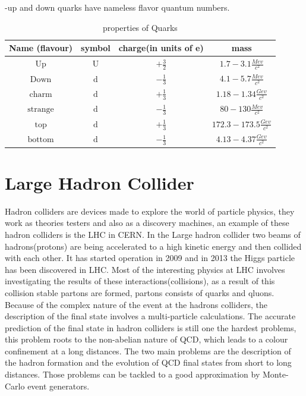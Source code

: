 -up and down quarks have nameless flavor quantum numbers.\citep{particle}

\begin{table}
\begin{center} 
 \begin{tabular}{|c|c|c|c|} \hline 
  Name (flavour) & symbol & charge(in units of e) & mass  \\ \hline 
  $\text{Up}$ & $\text{U}$ &$ +\frac{3}{2}$ & $1.7-3.1 \frac{Mev}{c^2}$\\\hline
  $\text{Down}$&$\text{d}$&$-\frac{1}{3}$& $4.1-5.7\frac{Mev}{c^2}$\\\hline
  $\text{charm}$&$\text{d}$&$+\frac{1}{3}$&$1.18-1.34\frac{Gev}{c^2}$\\\hline
  $\text{strange}$&$\text{d}$&$-\frac{1}{3}$&$80-130\frac{Mev}{c^2}$\\\hline
  $\text{top}$&$\text{d}$&$+\frac{1}{3}$&$172.3-173.5\frac{Gev}{c^2}$\\\hline
  $\text{bottom}$&$\text{d}$&$-\frac{1}{3}$&$4.13-4.37\frac{Gev}{c^2}$\\\hline
 \end{tabular}
 \caption{properties of Quarks}
\end{center}
\end{table}

\section{Large Hadron Collider}

Hadron colliders are devices made to explore the world of particle physics, they work as theories testers and also as a discovery machines, an example of these hadron colliders is the LHC in CERN. In the Large hadron collider two beams of hadrons(protons) are being accelerated to a high kinetic energy and then collided with each other. It has started operation in 2009 and in 2013 the Higgs particle has been discovered in LHC. Most of the interesting physics at LHC involves investigating the results of these interactions(collisions), as a result of this collision stable partons are formed, partons consists of quarks and qluons. Because of the complex nature of the event at the hadrons colliders, the description of the final state involves a multi-particle calculations. The accurate prediction of the final state in hadron colliders is still one the hardest problems, this problem roots to the non-abelian nature of QCD, which leads to a colour confinement at a long distances. The two main problems are the description of the hadron formation and the evolution of QCD final states from short to long distances. Those problems can be tackled to a good approximation by Monte-Carlo event generators. 

